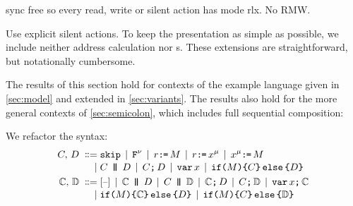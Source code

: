 \clearpage
sync free so every read, write or silent action has mode rlx.  No RMW.


Use explicit silent actions.
    To keep the presentation as simple as possible, we include neither address
calculation nor \RMW{}s.  These extensions are straightforward, but
notationally cumbersome.

The results of this section hold for contexts of the example language
given in \textsection\ref{sec:model} and extended in \textsection\ref{sec:variants}.
The results also hold for the more general contexts of
\textsection\ref{sec:semicolon}, which includes full sequential composition:


We refactor the syntax:
\begin{align*}
  \aCmd,\,\bCmd
  \BNFDEF& \SKIP
  \mkern-2mu\BNFSEP\mkern-2mu \FENCE^{\fmode}
  \mkern-2mu\BNFSEP\mkern-2mu \aReg\GETS\aExp
  \mkern-2mu\BNFSEP\mkern-2mu \aReg\GETS\aLoc^{\amode} 
  \mkern-2mu\BNFSEP\mkern-2mu \aLoc^{\amode}\GETS\aExp
  \\[-.5ex]
  \BNFSEP&\aCmd \PAR \bCmd
  \mkern-2mu\BNFSEP\mkern-2mu\aCmd \SEMI \bCmd
  \mkern-2mu\BNFSEP\mkern-2mu \VAR\aLoc
  \mkern-2mu\BNFSEP\mkern-2mu \IF{\aExp} \THEN \aCmd \ELSE \bCmd \FI
  \\
  \aCtxt,\,\bCtxt
  \BNFDEF& \hole{}
  \mkern-2mu\BNFSEP\mkern-2mu \aCtxt \PAR \bCmd
  \mkern-2mu\BNFSEP\mkern-2mu \aCmd \PAR \bCtxt
  \mkern-2mu\BNFSEP\mkern-2mu \aCtxt \SEMI \bCmd
  \mkern-2mu\BNFSEP\mkern-2mu \aCmd \SEMI \bCtxt
  \mkern-2mu\BNFSEP\mkern-2mu \VAR\aLoc\SEMI \aCtxt
  \\[-.5ex]
  \BNFSEP& \IF{\aExp} \THEN \aCtxt \ELSE \bCmd \FI
  \mkern-2mu\BNFSEP\mkern-2mu \IF{\aExp} \THEN \aCmd \ELSE \bCtxt \FI
\end{align*}


